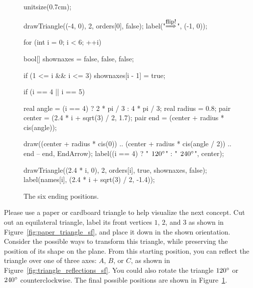 \documentclass[../textbook.tex]{subfiles}
\begin{document}
\begin{figure}[h]
	\begin{center}
		\begin{minipage}[b]{\textwidth}
			\centering
			\begin{asy}[width=0.5\textwidth]
				unitsize(0.7cm);
				
				drawTriangle((-4, 0), 2, orders[0], false);
				label("$\stackrel{\mbox{\small flip!}}{\Longrightarrow}$", (-1, 0));
				
				for (int i = 0; i < 6; ++i) {
					bool[] shownaxes = {false, false, false};
					
					if (1 <= i && i <= 3) {
						shownaxes[i - 1] = true;
					}
					
					if (i == 4 || i == 5) {
						real angle = (i == 4) ? 2 * pi / 3 : 4 * pi / 3;
						real radius = 0.8;
						pair center = (2.4 * i + sqrt(3) / 2, 1.7);
						pair end = (center + radius * cis(angle));
						
						draw((center + radius * cis(0)) .. (center + radius * cis(angle / 2)) .. end -- end, EndArrow);
						label((i == 4) ? "$\phantom{\degree}120\degree$" : "$\phantom{\degree}240\degree$", center);
					}
					
					drawTriangle((2.4 * i, 0), 2, orders[i], true, shownaxes, false);
					label(names[i], (2.4 * i + sqrt(3) / 2, -1.4));
				}
			\end{asy}
		\end{minipage}
	\end{center}
	\vspace*{-2\baselineskip}
	\begin{center}
		\begin{minipage}[t]{\textwidth}
			\caption{The six ending positions.}
			\label{fig:triangle_isos_sf}
		\end{minipage}
	\end{center}
	\vspace*{-2\baselineskip}
\end{figure}



\noindent Please use a paper or cardboard triangle to help visualize the next concept. Cut out an equilateral triangle, label its front vertices $1$, $2$, and $3$ as shown in Figure~\ref{fig:paper_triangle_sf}, and place it down in the shown orientation. Consider the possible ways to transform this triangle, while preserving the position of its shape on the plane. From this starting position, you can reflect the triangle over one of three axes: $A$, $B$, or $C$, as shown in Figure~\ref{fig:triangle_reflections_sf}. You could also rotate the triangle $120^\circ{}$ or $240^\circ{}$ counterclockwise. The final possible positions are shown in Figure~\ref{fig:triangle_isos_sf}.
\end{document}
